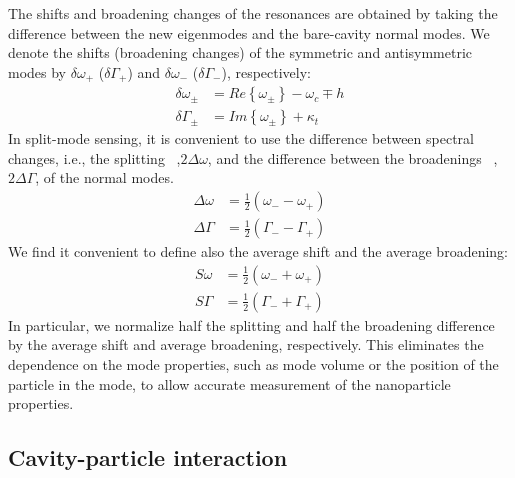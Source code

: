 \documentclass[journal=jacsat,manuscript=article]{achemso}
\begin{document}
The shifts and broadening changes of the resonances are obtained by taking the difference between the new eigenmodes and the bare-cavity normal modes. We denote the shifts (broadening changes) of the symmetric and antisymmetric modes by $\delta \omega_+$ ($\delta \Gamma_+$) and $\delta \omega_-$ ($\delta \Gamma_-$), respectively:
\begin{equation}
\begin{split}
\delta \omega_{\pm} &= Re \left\{ \omega_{\pm} \right\} - \omega_c \mp h \\
\delta \Gamma_{\pm} &= Im \left\{ \omega_{\pm} \right\} + \kappa_t
\end{split}
\label{eq:splitting_broadening}
\end{equation}
In split-mode sensing, it is convenient to use the difference between spectral changes, i.e., the splitting~\cite{zhu2010} ,$2 \Delta \omega$, and the difference between the broadenings~\cite{shao2013detection} ,$2 \Delta \Gamma$, of the normal modes.
\begin{equation}
\begin{split}
\Delta \omega &= \frac{1}{2} \left( \omega_{-} - \omega_{+} \right)\\
\Delta \Gamma &= \frac{1}{2} \left( \Gamma_{-} - \Gamma_{+} \right)
\end{split}
\end{equation}
We find it convenient to define also the average shift and the average broadening:
\begin{equation}
\begin{split}
S \omega &= \frac{1}{2} \left( \omega_{-} + \omega_{+} \right)\\
S \Gamma &= \frac{1}{2} \left( \Gamma_{-} + \Gamma_{+} \right)
\end{split}
\end{equation}
In particular, we normalize half the splitting and half the broadening difference by the average shift and average broadening, respectively. This eliminates the dependence on the mode properties, such as mode volume or the position of the particle in the mode, to allow accurate measurement of the nanoparticle properties.

\subsection{Cavity-particle interaction}
\end{document}
